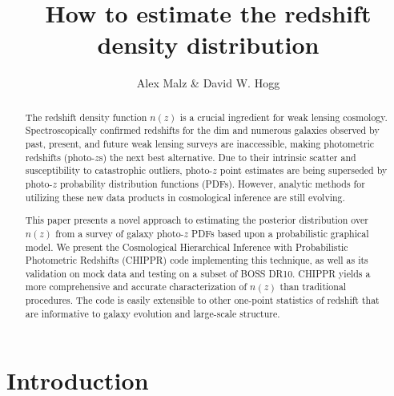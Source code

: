 \documentclass[preprint]{aastex}
\begin{document}
\title{How to estimate the redshift density distribution}

\author{Alex Malz \& David W. Hogg}


\begin{abstract}
The redshift density function $n(z)$ is a crucial ingredient for weak lensing cosmology.  Spectroscopically confirmed redshifts for the dim and numerous galaxies observed by past, present, and future weak lensing surveys are inaccessible, making photometric redshifts (photo-$z$s) the next best alternative.  Due to their intrinsic scatter and susceptibility to catastrophic outliers, photo-$z$ point estimates are being superseded by photo-$z$ probability distribution functions (PDFs).  However, analytic methods for utilizing these new data products in cosmological inference are still evolving.

This paper presents a novel approach to estimating the posterior distribution over $n(z)$ from a survey of galaxy photo-$z$ PDFs based upon a probabilistic graphical model.  We present the Cosmological Hierarchical Inference with Probabilistic Photometric Redshifts (CHIPPR) code implementing this technique, as well as its validation on mock data and testing on a subset of BOSS DR10.  CHIPPR yields a more comprehensive and accurate characterization of $n(z)$ than traditional procedures.  The code is easily extensible to other one-point statistics of redshift that are informative to galaxy evolution and large-scale structure.

\end{abstract}


\section{Introduction}
\label{sec:intro}
\end{document}
